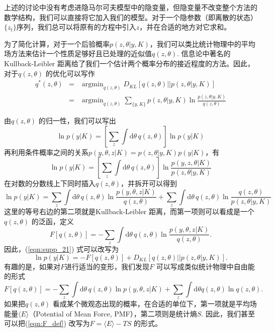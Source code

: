 \documentclass[11pt, a4paper]{article}
\DeclareMathOperator*{\argmin}{argmin}
\begin{document}
    上述的讨论中没有考虑进隐马尔可夫模型中的隐变量，但隐变量不改变整个方法的数学结构，我们可以直接将它加入我们的模型。对于一个隐参数（即离散的状态）$\{z_t\}$序列，我们总可以将原有的方程中引入$z$，并在合适的地方对它求和。

    为了简化计算，对于一个后验概率$p(z,\theta|y, K)$，我们可以类比统计物理中的平均场方法来估计一个性质足够好且已处理的近似值$q(z,\theta)$. 信息论中著名的Kullback-Leibler 距离给了我们一个估计两个概率分布的接近程度的方法。因此，对于$q(z,\theta)$ 的优化可以写作
    \begin{eqnarray}
      q^*(z,\theta) &=& \argmin_{q(z,\theta)} D_{KL}[q(z,\theta) || p(z,\theta|y,K)] \\
                    &=& \argmin_{q(z,\theta)}\sum_{\{y,K\}} p(z,\theta|y,K)\ln\frac{p(z,\theta|y,K)}{q(z,\theta)}
    \end{eqnarray}

    由$q(z,\theta)$ 的归一性，我们可以写出
    $$\ln p(y|K) = \left[\sum_z\int \mathrm d\theta\, q(z,\theta)\right]\ln p(y|K)$$
    再利用条件概率之间的关系$p(y,\theta,z|K) = p(z,\theta|y, K)p(y|K)$，有
    $$\ln p(y|K) = \left[\sum_z\int \mathrm d\theta\, q(z,\theta)\right]\ln \frac{p(y,z,\theta|K)}{p(z,\theta|y,K)}$$
    在对数的分数线上下同时插入$q(z,\theta)$，并拆开可以得到
    \begin{equation}\label{eqn:supp_21}
      \ln p(y|K) = \sum_z\int \mathrm d\theta\, q(z,\theta)\ln\frac{p(y,\theta,z|K)}{q(z,\theta)}+\sum_z\int \mathrm d\theta\, q(z,\theta)\ln\frac{q(z,\theta)}{p(z,\theta|y,K)}
    \end{equation}
    这里的等号右边的第二项就是Kullback-Leibler 距离，而第一项则可以看成是一个$q(z,\theta)$ 的泛函，定义
    \begin{equation}\label{eqn:F_def}
      F[q(z,\theta)] = -\sum_z\int \mathrm d\theta\, q(z,\theta)\ln\frac{p(y,\theta,z|K)}{q(z,\theta)}.
    \end{equation}
    因此，(\ref{eqn:supp_21}) 式可以改写为
    \begin{equation}\label{eqn:supp_24}
      \ln p(y|K)= -F[q(z,\theta)] +D_{KL}[q(z,\theta)||p(z,\theta| y, K)].
    \end{equation}
    有趣的是，如果对$F$进行适当的变形，我们发现$F$ 可以写成类似统计物理中自由能的形式
    $$F[q(z,\theta)] = -\sum_z\int \mathrm d\theta\, q(z,\theta)\ln p(y,\theta,z|K) + \sum_z\int \mathrm d\theta q(z,\theta)\ln q(z,\theta).$$
    如果把$q(z,\theta)$ 看成某个微观态出现的概率，在合适的单位下，第一项就是平均场能量$\langle E\rangle$（Potential of Mean Force, PMF），第二项则是统计熵$S$. 因此，我们甚至可以把(\ref{eqn:F_def}) 改写为$F=\langle E\rangle -TS$ 的形式。
\end{document}
